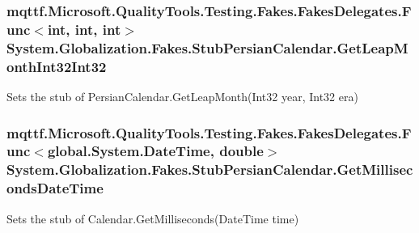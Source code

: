 \hypertarget{class_system_1_1_globalization_1_1_fakes_1_1_stub_persian_calendar_a5d6fb3d495f76c8061f2fb248adf6b44}{
\subsubsection[{Get\-Leap\-Month\-Int32\-Int32}]{\setlength{\rightskip}{0pt plus 5cm}mqttf.\-Microsoft.\-Quality\-Tools.\-Testing.\-Fakes.\-Fakes\-Delegates.\-Func$<$int, int, int$>$ System.\-Globalization.\-Fakes.\-Stub\-Persian\-Calendar.\-Get\-Leap\-Month\-Int32\-Int32}}\label{class_system_1_1_globalization_1_1_fakes_1_1_stub_persian_calendar_a5d6fb3d495f76c8061f2fb248adf6b44}


Sets the stub of Persian\-Calendar.\-Get\-Leap\-Month(\-Int32 year, Int32 era)

\hypertarget{class_system_1_1_globalization_1_1_fakes_1_1_stub_persian_calendar_aa05c82c28306bf8ad35e9f2290a31549}{
\subsubsection[{Get\-Milliseconds\-Date\-Time}]{\setlength{\rightskip}{0pt plus 5cm}mqttf.\-Microsoft.\-Quality\-Tools.\-Testing.\-Fakes.\-Fakes\-Delegates.\-Func$<$global.\-System.\-Date\-Time, double$>$ System.\-Globalization.\-Fakes.\-Stub\-Persian\-Calendar.\-Get\-Milliseconds\-Date\-Time}}\label{class_system_1_1_globalization_1_1_fakes_1_1_stub_persian_calendar_aa05c82c28306bf8ad35e9f2290a31549}


Sets the stub of Calendar.\-Get\-Milliseconds(\-Date\-Time time)

